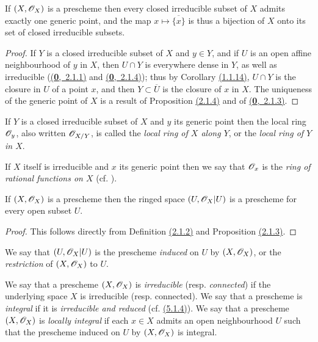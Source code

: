 \begin{prop}[2.1.5]
\label{prop-1.2.1.5}
If $(X,\mathscr{O}_X)$ is a prescheme then every closed
irreducible subset of $X$ admits exactly one generic point, and the map
$x\mapsto\overline{\{x\}}$ is thus a bijection of $X$ onto its set of closed
irreducible subsets.
\end{prop}

\begin{proof}
\label{proof-prop-1.2.1.5}
If $Y$ is a closed irreducible subset of $X$ and $y\in Y$, and if $U$
is an open affine neighbourhood of $y$ in $X$, then $U\cap Y$ is everywhere
dense in $Y$, as well as irreducible (\hyperref[env-0.2.1.1]{(\textbf{0},~2.1.1)} and \hyperref[env-0.2.1.4]{(\textbf{0},~2.1.4)}); thus by
Corollary \hyperref[cor-1.1.1.14]{(1.1.14)}, $U\cap Y$ is the closure in $U$ of a point $x$, and then
$Y\subset\overline{U}$ is the closure of $x$ in $X$. The uniqueness of the
generic point of $X$ is a result of Proposition \hyperref[prop-1.2.1.4]{(2.1.4)} and of \hyperref[env-0.2.1.3]{(\textbf{0},~2.1.3)}.
\end{proof}

\begin{env}[2.1.6]
\label{env-1.2.1.6}
If $Y$ is a closed irreducible subset of $X$ and $y$ its
generic point then the local ring $\mathscr{O}_y$, also written $\mathscr{O}_{X/Y}$, is called the
{\it local ring of $X$ along $Y$}, or the {\it local ring of $Y$ in $X$}.

If $X$ itself is irreducible and $x$ its generic point then we say that
$\mathscr{O}_x$ is the {\it ring of rational functions on $X$} (cf. ).
\end{env}

\begin{prop}[2.1.7]
\label{prop-1.2.1.7}
If $(X,\mathscr{O}_X)$ is a prescheme then the ringed
space $(U,\mathscr{O}_X|U)$ is a prescheme for every open subset $U$.
\end{prop}

\begin{proof}
\label{proof-prop-1.2.1.7}
This follows directly from Definition \hyperref[defn-1.2.1.2]{(2.1.2)} and Proposition \hyperref[prop-1.2.1.3]{(2.1.3)}.
\end{proof}

We say that $(U,\mathscr{O}_X|U)$ is the prescheme {\it induced} on $U$ by
$(X,\mathscr{O}_X)$, or the {\it restriction} of $(X,\mathscr{O}_X)$ to $U$.

\begin{env}[2.1.8]
\label{env-1.2.1.8}
We say that a prescheme $(X,\mathscr{O}_X)$ is {\it irreducible}
(resp. {\it connected}) if the underlying space $X$ is irreducible (resp.
connected). We say that a prescheme is {\it integral} if it is
{\it irreducible and reduced} (cf. \hyperref[env-1.5.1.4]{(5.1.4)}). We say that a prescheme
$(X,\mathscr{O}_X)$ is {\it locally integral} if each $x\in X$ admits an open
neighbourhood $U$ such that the prescheme induced on $U$ by $(X,\mathscr{O}_X)$ is integral.
\end{env}

